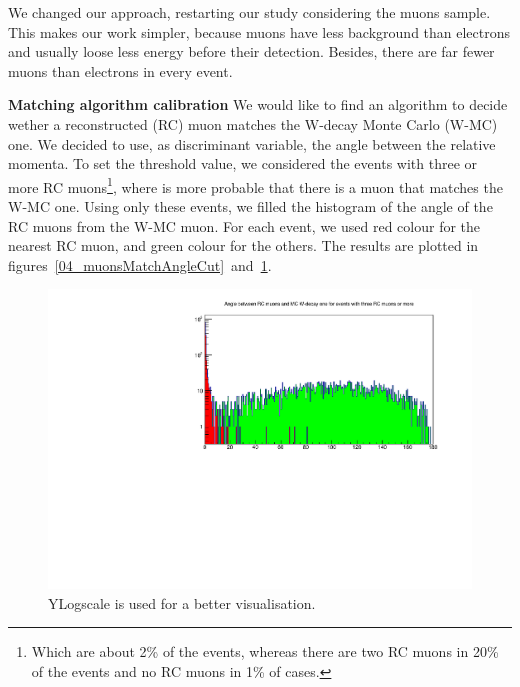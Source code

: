 We changed our approach, restarting our study considering the muons sample. This makes our work simpler, because muons have less background than electrons and usually loose less energy before their detection. Besides, there are far fewer muons than electrons in every event.

\textbf{Matching algorithm calibration}
We would like to find an algorithm to decide wether a reconstructed (RC) muon matches the W-decay Monte Carlo (W-MC) one. We decided to use, as discriminant variable, the angle between the relative momenta. To set the threshold value, we considered the events with three or more RC muons\footnote{Which are about 2\% of the events, whereas there are two RC muons in 20\% of the events and no RC muons in 1\% of cases.}, where is more probable that there is a muon that matches the W-MC one. Using only these events, we filled the histogram of the angle of the RC muons from the W-MC 	muon. For each event, we used red colour for the nearest RC muon, and green colour for the others. The results are plotted in figures~\ref{04_muonsMatchAngleCut}~and~\ref{04_muonsMatchAngleCutLog}.

\begin{figure} [htp]
\centering
\includegraphics[scale=0.7]{04_muonsMatchAngleCutLog.pdf}
\caption{YLogscale is used for a better visualisation.}
\label{04_muonsMatchAngleCutLog}
\end{figure}

